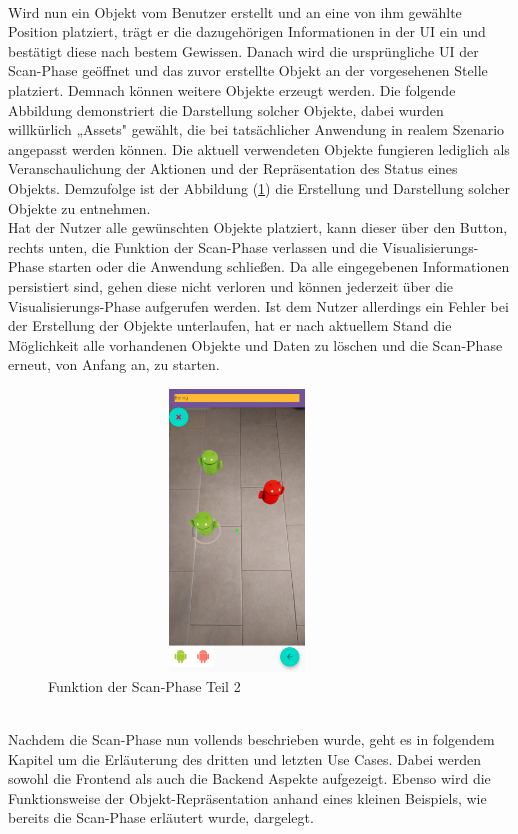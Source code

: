 \pagebreak 
\\ 
\linebreak
Wird nun ein Objekt vom Benutzer erstellt und an eine von ihm gewählte Position platziert, trägt er die dazugehörigen Informationen in der \acs{UI} 
ein und bestätigt diese nach bestem Gewissen. Danach wird die ursprüngliche \acs{UI} der Scan-Phase geöffnet und das zuvor erstellte Objekt an der vorgesehenen 
Stelle platziert. Demnach können weitere Objekte erzeugt werden. Die folgende Abbildung demonstriert die Darstellung solcher Objekte, dabei wurden willkürlich 
„Assets" gewählt, die bei tatsächlicher Anwendung in realem Szenario angepasst werden können. Die aktuell verwendeten Objekte fungieren lediglich als 
Veranschaulichung der Aktionen und der Repräsentation des Status eines Objekts. Demzufolge ist der Abbildung (\ref{pic:place_objects}) die Erstellung und 
Darstellung solcher Objekte zu entnehmen. 
\\ 
\linebreak
Hat der Nutzer alle gewünschten Objekte platziert, kann dieser über den Button, rechts unten, die Funktion der Scan-Phase verlassen und die 
Visualisierungs-Phase starten oder die Anwendung schließen. Da alle eingegebenen Informationen persistiert sind, gehen diese nicht verloren und können jederzeit 
über die Visualisierungs-Phase aufgerufen werden. Ist dem Nutzer allerdings ein Fehler bei der Erstellung der Objekte unterlaufen, hat er nach aktuellem Stand 
die Möglichkeit alle vorhandenen Objekte und Daten zu löschen und die Scan-Phase erneut, von Anfang an, zu starten.  
\begin{figure}[hbt!]
    \centering
    \includegraphics[width=10cm,height=7.5cm,keepaspectratio]{4Umsetzung/Bilder/place_objects_view.jpg}
    \caption{Funktion der Scan-Phase Teil 2}
    \label{pic:place_objects}
\end{figure}
\pagebreak
\\ 
\linebreak
Nachdem die Scan-Phase nun vollends beschrieben wurde, geht es in folgendem Kapitel um die Erläuterung des dritten und letzten Use Cases. Dabei werden sowohl 
die Frontend als auch die Backend Aspekte aufgezeigt. Ebenso wird die Funktionsweise der Objekt-Repräsentation anhand eines kleinen Beispiels, wie bereits 
die Scan-Phase erläutert wurde, dargelegt.